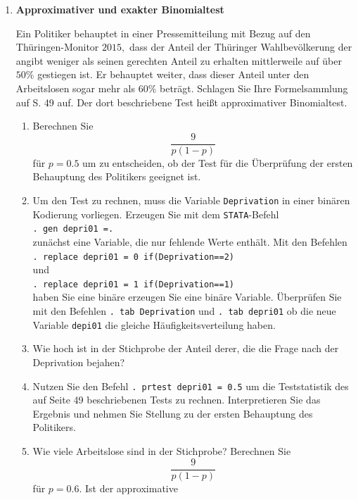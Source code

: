 \documentclass[11pt]{article}
\newcommand{\aufgabe}[1]{\item{\bf #1}}
\begin{document}
\begin{enumerate}
\aufgabe{Approximativer und exakter Binomialtest}\\
\vspace{0.5cm}
%

Ein Politiker behauptet in einer Pressemitteilung mit Bezug auf den Thüringen-Monitor $2015,$ dass der Anteil der Thüringer Wahlbevölkerung
der angibt weniger als seinen gerechten Anteil zu erhalten mittlerweile auf über $50\%$ gestiegen ist. Er behauptet weiter, dass 
dieser Anteil unter den Arbeitslosen sogar mehr als $60\%$ beträgt.
 Schlagen Sie Ihre Formelsammlung auf
S. 49 auf. Der dort beschriebene Test heißt approximativer Binomialtest.
%
\begin{enumerate}
\item{Berechnen Sie $$\frac{9}{p(1-p)}$$ für $p=0.5$ um zu entscheiden, ob der Test für die Überprüfung
der ersten Behauptung des Politikers geeignet ist.}
\item{Um den Test zu rechnen, muss die Variable 
\texttt{Deprivation} in einer binären Kodierung vorliegen. Erzeugen Sie mit dem \texttt{STATA}-Befehl \\  \texttt{. gen depri01 =.} \\
zunächst eine Variable, die nur fehlende Werte enthält. Mit den Befehlen
\\ \texttt{. replace depri01 = 0 if(Deprivation==2)}\\ und \\ \texttt{. replace depri01 = 1 if(Deprivation==1)}\\ haben Sie eine binäre
erzeugen Sie eine binäre Variable. Überprüfen Sie mit den Befehlen 
\texttt{. tab Deprivation} und \texttt{. tab depri01} ob die neue Variable \texttt{depi01}
die gleiche Häufigkeitsverteilung haben.}
\item{Wie hoch ist in der Stichprobe der Anteil derer, die die Frage nach der Deprivation bejahen?}
\item{Nutzen Sie den Befehl \texttt{. prtest depri01 = 0.5} um die Teststatistik des auf Seite 49 beschriebenen Tests zu rechnen.
Interpretieren Sie das Ergebnis und nehmen Sie Stellung zu der ersten Behauptung des Politikers.}
\item{Wie viele Arbeitslose sind in der Stichprobe? Berechnen Sie $$\frac{9}{p(1-p)}$$ für $p=0.6.$ Ist der approximative
}
\end{enumerate}
\end{enumerate}
\end{document}
